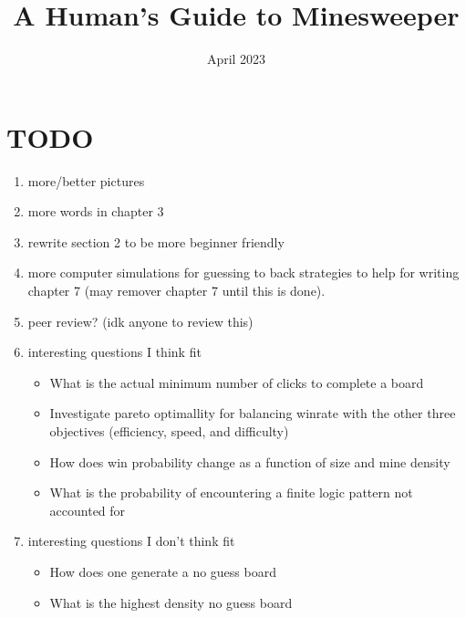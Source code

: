\documentclass{report}
\title{A Human's Guide to Minesweeper}
\author{}
\date{April 2023}
\begin{document}
\maketitle
\newpage


\newpage

\tableofcontents
\newpage


\newpage


\newpage


\newpage


\newpage


\newpage


\newpage


\newpage


\newpage

\printindex
\newpage

\section*{TODO}
\begin{enumerate}
    \item more/better pictures
    \item more words in chapter 3
    \item rewrite section 2 to be more beginner friendly
    \item more computer simulations for guessing to back strategies to help for writing chapter 7 (may remover chapter 7 until this is done).
    \item peer review? (idk anyone to review this)
    \item interesting questions I think fit\begin{itemize}
        \item What is the actual minimum number of clicks to complete a board
        \item Investigate pareto optimallity for balancing winrate with the other three objectives (efficiency, speed, and difficulty)
        \item How does win probability change as a function of size and mine density
        \item What is the probability of encountering a finite logic pattern not accounted for
    \end{itemize}
    \item interesting questions I don't think fit\begin{itemize}
        \item How does one generate a no guess board
        \item What is the highest density no guess board
    \end{itemize}
\end{enumerate}
\end{document}
